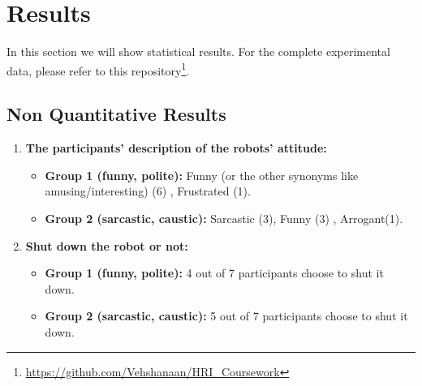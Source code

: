 \documentclass[conference]{IEEEtran}
\begin{document}
\section{Results}


In this section we will show statistical results. For the complete experimental data, please refer to this repository\footnote[1]{\url{https://github.com/Vehshanaan/HRI_Coursework}}.

\subsection{Non Quantitative Results}



\begin{enumerate}
    \item \textbf{The participants' description of the robots' attitude:}
    \begin{itemize}
    \item \textbf{Group 1 (funny, polite):} Funny (or the other synonyms like amusing/interesting) (6) , Frustrated (1).
    \item \textbf{Group 2 (sarcastic, caustic):} Sarcastic (3), Funny (3) , Arrogant(1). 
    \end{itemize}
    \item \textbf{Shut down the robot or not:}
    \begin{itemize}
    \item \textbf{Group 1 (funny, polite):} 4 out of 7 participants choose to shut it down.
    \item \textbf{Group 2 (sarcastic, caustic):} 5 out of 7 participants choose to shut it down. 
    \end{itemize}
\end{enumerate}
\end{document}

